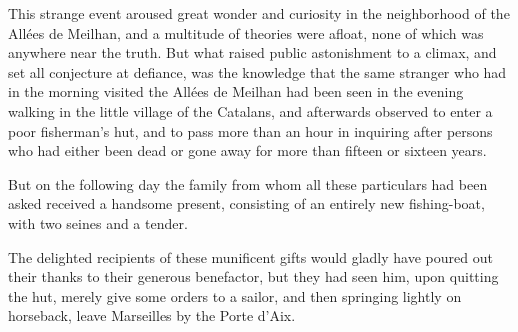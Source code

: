 This strange event aroused great wonder and curiosity in the
neighborhood of the Allées de Meilhan, and a multitude of theories were
afloat, none of which was anywhere near the truth. But what raised
public astonishment to a climax, and set all conjecture at defiance,
was the knowledge that the same stranger who had in the morning visited
the Allées de Meilhan had been seen in the evening walking in the
little village of the Catalans, and afterwards observed to enter a poor
fisherman’s hut, and to pass more than an hour in inquiring after
persons who had either been dead or gone away for more than fifteen or
sixteen years.

But on the following day the family from whom all these particulars had
been asked received a handsome present, consisting of an entirely new
fishing-boat, with two seines and a tender.

The delighted recipients of these munificent gifts would gladly have
poured out their thanks to their generous benefactor, but they had seen
him, upon quitting the hut, merely give some orders to a sailor, and
then springing lightly on horseback, leave Marseilles by the Porte
d’Aix.
